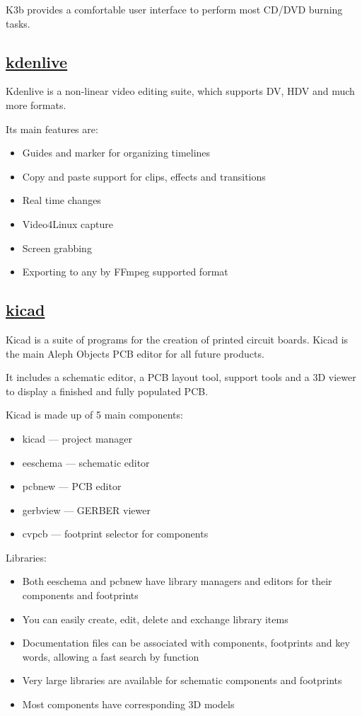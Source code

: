  K3b provides a comfortable user interface to perform most CD/DVD burning
 tasks.

\subsection{\href{http://www.kdenlive.org/}{kdenlive}}

 Kdenlive is a non-linear video editing suite, which supports DV, HDV and
 much more formats.

 Its main features are:

\begin{itemize}
 \item Guides and marker for organizing timelines
 \item Copy and paste support for clips, effects and transitions
 \item Real time changes
 \item Video4Linux capture
 \item Screen grabbing
 \item Exporting to any by FFmpeg supported format
\end{itemize}

\subsection{\href{http://www.kicad-pcb.org}{kicad}}

Kicad is a suite of programs for the creation of printed circuit boards.
Kicad is the main Aleph Objects PCB editor for all future products.

 It includes a schematic editor, a PCB layout tool, support tools and a
 3D viewer to display a finished and fully populated PCB.
 
 Kicad is made up of 5 main components:

\begin{itemize}
 \item  kicad --- project manager
 \item  eeschema --- schematic editor
 \item  pcbnew --- PCB editor
 \item  gerbview --- GERBER viewer
 \item  cvpcb --- footprint selector for components
\end{itemize}
 
 Libraries:

\begin{itemize}
 \item Both eeschema and pcbnew have library managers and editors for their
    components and footprints
 \item You can easily create, edit, delete and exchange library items
 \item Documentation files can be associated with components, footprints and key
    words, allowing a fast search by function
 \item Very large libraries are available for schematic components and footprints
 \item Most components have corresponding 3D models
\end{itemize}

